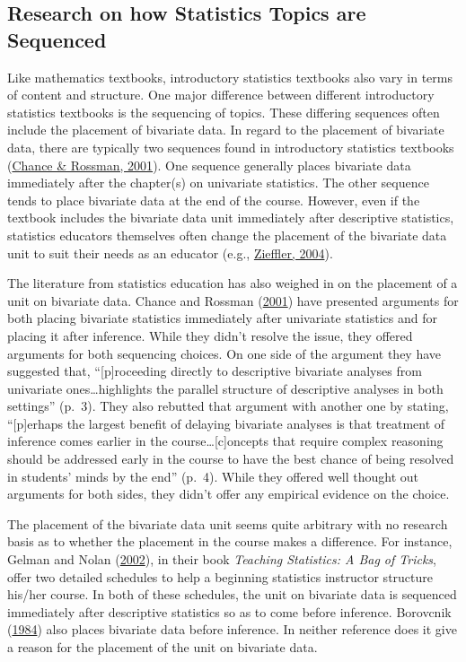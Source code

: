 \documentclass[11pt]{umnthesis}
\begin{document}
\hypertarget{research-on-how-statistics-topics-are-sequenced}{%
\subsection{Research on how Statistics Topics are Sequenced}\label{research-on-how-statistics-topics-are-sequenced}}

Like mathematics textbooks, introductory statistics textbooks also vary in terms of content and structure. One major difference between different introductory statistics textbooks is the sequencing of topics. These differing sequences often include the placement of bivariate data. In regard to the placement of bivariate data, there are typically two sequences found in introductory statistics textbooks (\protect\hyperlink{ref-chance:2001}{Chance \& Rossman, 2001}). One sequence generally places bivariate data immediately after the chapter(s) on univariate statistics. The other sequence tends to place bivariate data at the end of the course. However, even if the textbook includes the bivariate data unit immediately after descriptive statistics, statistics educators themselves often change the placement of the bivariate data unit to suit their needs as an educator (e.g., \protect\hyperlink{ref-zieffler:2004}{Zieffler, 2004}).

The literature from statistics education has also weighed in on the placement of a unit on bivariate data. Chance and Rossman (\protect\hyperlink{ref-chance:2001}{2001}) have presented arguments for both placing bivariate statistics immediately after univariate statistics and for placing it after inference. While they didn't resolve the issue, they offered arguments for both sequencing choices. On one side of the argument they have suggested that, ``{[}p{]}roceeding directly to descriptive bivariate analyses from univariate ones\ldots highlights the parallel structure of descriptive analyses in both settings'' (p.~3). They also rebutted that argument with another one by stating, ``{[}p{]}erhaps the largest benefit of delaying bivariate analyses is that treatment of inference comes earlier in the course\ldots {[}c{]}oncepts that require complex reasoning should be addressed early in the course to have the best chance of being resolved in students' minds by the end'' (p.~4). While they offered well thought out arguments for both sides, they didn't offer any empirical evidence on the choice.

The placement of the bivariate data unit seems quite arbitrary with no research basis as to whether the placement in the course makes a difference. For instance, Gelman and Nolan (\protect\hyperlink{ref-gelman:2002}{2002}), in their book \emph{Teaching Statistics: A Bag of Tricks}, offer two detailed schedules to help a beginning statistics instructor structure his/her course. In both of these schedules, the unit on bivariate data is sequenced immediately after descriptive statistics so as to come before inference. Borovcnik (\protect\hyperlink{ref-borovcnik:1984}{1984}) also places bivariate data before inference. In neither reference does it give a reason for the placement of the unit on bivariate data.
\end{document}
